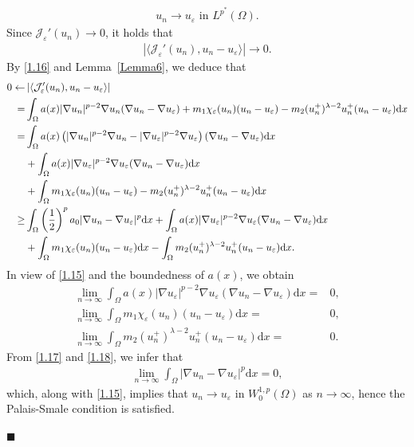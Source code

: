 \documentclass[onecolumn]{autart}
\newenvironment{proof}{{\it Proof: \enspace}}{\hfill $\blacksquare$\par}
\begin{document}
\begin{proof}
\begin{align}
		u_n \to u_\varepsilon \text{ in } L^{p^*}(\Omega).
	\end{align}
	Since $\mathcal{J}_\varepsilon'(u_n) \to 0$, it holds that
	\begin{align} \label{1.16}
		\left| \langle \mathcal{J}_\varepsilon'(u_n), u_n - u_\varepsilon \rangle \right| \to 0.
	\end{align}
	By \eqref{1.16} and Lemma~\ref{Lemma6}, we deduce that
	\begin{align}
		0 \leftarrow &\left| \langle \mathcal{J}_\varepsilon'(u_n), u_n - u_\varepsilon \rangle \right|
		\notag \\
		=& \int_{\Omega}  a(x) |\nabla u_n|^{p-2} \nabla u_n (\nabla u_n - \nabla u_\varepsilon) + m_1 \chi_{\varepsilon}(u_n)(u_n - u_\varepsilon) - m_2 (u_n^+)^{\lambda - 2} u_n^+(u_n - u_\varepsilon)  \mathrm{d}x
		\notag\\=
		& \int_{\Omega}  a(x) \left( |\nabla u_n|^{p-2} \nabla u_n -  |\nabla u_\varepsilon|^{p-2} \nabla u_\varepsilon\right)  (\nabla u_n - \nabla u_\varepsilon)\mathrm{d}x
		\notag\\
		&+ \int_{\Omega}a(x)|\nabla u_\varepsilon|^{p-2} \nabla u_\varepsilon (\nabla u_n - \nabla u_\varepsilon)  \mathrm{d}x
		\notag\\
		&+  \int_{\Omega}m_1 \chi_{\varepsilon}(u_n)(u_n - u_\varepsilon) - m_2 (u_n^+)^{\lambda - 2} u_n^+(u_n - u_\varepsilon)  \mathrm{d}x
		\notag\\ \geq
		& \int_{\Omega} \left( \frac{1}{2}\right)^p a_0 |\nabla u_n - \nabla u_\varepsilon|^{p} \mathrm{d}x + \int_{\Omega}a(x)|\nabla u_\varepsilon|^{p-2} \nabla u_\varepsilon (\nabla u_n - \nabla u_\varepsilon)  \mathrm{d}x \notag\\
		&+  \int_{\Omega}m_1 \chi_{\varepsilon}(u_n)(u_n - u_\varepsilon) \mathrm{d}x - \int_{\Omega}m_2 (u_n^+)^{\lambda - 2} u_n^+(u_n - u_\varepsilon)  \mathrm{d}x.\label{1.17}
	\end{align}
	In view of \eqref{1.15} and the boundedness of $a(x)$, we obtain
	\begin{subequations}\label{1.18}
		\begin{align}
			\lim_{n \to \infty}\int_{\Omega}a(x)|\nabla u_\varepsilon|^{p-2} \nabla u_\varepsilon (\nabla u_n - \nabla u_\varepsilon)  \mathrm{d}x =&0 , \\
			\lim_{n \to \infty}\int_{\Omega}m_1 \chi_{\varepsilon}(u_n)(u_n - u_\varepsilon) \mathrm{d}x =&0 ,\\
			\lim_{n \to \infty}\int_{\Omega}m_2 (u_n^+)^{\lambda - 2} u_n^+(u_n - u_\varepsilon)  \mathrm{d}x=&0.
		\end{align}
	\end{subequations}
	From \eqref{1.17} and \eqref{1.18}, we infer that
	\begin{align}\label{1.19}
		\lim_{n \to \infty} \int_{\Omega}|\nabla u_n - \nabla u_\varepsilon|^{p} \mathrm{d}x=0,
	\end{align}
	which, along with \eqref{1.15}, implies that $u_n \to u_\varepsilon$ in $W^{1,p}_0(\Omega)$ as $n \to \infty$, hence the Palais-Smale condition is satisfied.
	

\end{proof}
\end{document}
